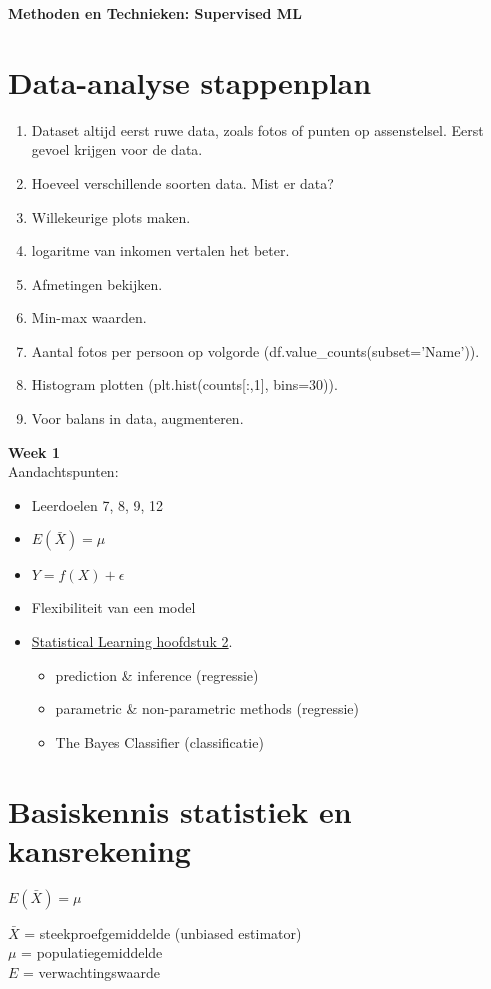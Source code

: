 {\large
\begin{center}
    {\Large \textbf{Methoden en Technieken: Supervised ML}}\\
\end{center}
\tableofcontents
\newpage
\section*{Data-analyse stappenplan}
\begin{enumerate}
    \item Dataset altijd eerst ruwe data, zoals fotos of punten op assenstelsel. Eerst gevoel krijgen voor de data.
    \item Hoeveel verschillende soorten data. Mist er data? 
    \item Willekeurige plots maken.
    \item logaritme van inkomen vertalen het beter. 
    \item Afmetingen bekijken.
    \item Min-max waarden.
    \item Aantal fotos per persoon op volgorde (df.value\_counts(subset='Name')).
    \item Histogram plotten (plt.hist(counts[:,1], bins=30)).
    \item Voor balans in data, augmenteren.
\end{enumerate}
\newpage
\textbf{{\LARGE Week 1}}\\
Aandachtspunten:
\begin{itemize}
    \item Leerdoelen 7, 8, 9, 12
    \item $E(\bar{X})=\mu$ %
    \item $Y=f(X)+\epsilon$
    \item Flexibiliteit van een model
    \item \href{https://hastie.su.domains/ISLR2/ISLRv2_website.pdf}{Statistical Learning hoofdstuk 2}.
    \begin{itemize}
        \item prediction \& inference (regressie)
        \item parametric \& non-parametric methods (regressie)
        \item The Bayes Classifier (classificatie)
    \end{itemize}
\end{itemize}

\section{Basiskennis statistiek en kansrekening}
\begin{center}
    $E(\bar{X})=\mu$
\end{center}
\noindent $\bar{X}$ = steekproefgemiddelde (unbiased estimator)\\
$\mu$ = populatiegemiddelde\\
$E$ = verwachtingswaarde\\ \vspace{0.3cm}

}
